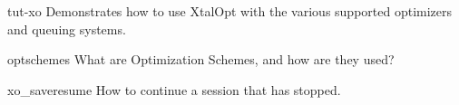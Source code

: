 
\begin{DoxyItemize}
\item tut-\/xo Demonstrates how to use Xtal\-Opt with the various supported optimizers and queuing systems.
\item optschemes What are Optimization Schemes, and how are they used?
\item xo\-\_\-saveresume How to continue a session that has stopped. 
\end{DoxyItemize}